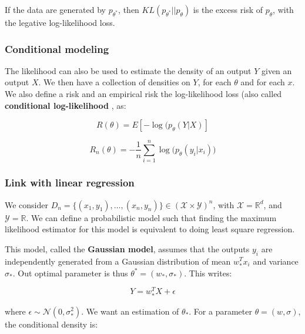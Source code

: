 \documentclass[
10pt, %
a4paper, %
oneside, %
headinclude,footinclude, %
BCOR5mm, %
]{scrartcl}
\begin{document}
\begin{lemma}
    
    If the data are generated by $p_{\theta^*}$, then $ KL(p_{\theta^*}||p_{\theta})$ is the excess risk of $p_{\theta}$, with the legative log-likelihood loss.
\end{lemma}

\subsubsection{\large\color{Periwinkle}Conditional modeling}

The likelihood can also be used to estimate the density of an output $Y$ given an output $X$. We then have a collection of densities on $Y$, for each $\theta$ and for each $x$. We also define a risk and an empirical risk the log-likelihood loss (also called \textbf{{conditional log-likelihood}} , as:

\begin{equation*}
    R(\theta) = E[-\log(p_{\theta}(Y|X)]
\end{equation*}

\begin{equation*}
    R_n(\theta) = - \frac{1}{n} \sum^{n}_{i=1} \log\big(p_{\theta}(y_i|x_i)\big)
\end{equation*}

\subsubsection{\large\color{Periwinkle}Link with linear regression}

We consider $D_n = \{(x_1, y_1), \dots, (x_n, y_n)\}\in (\mathcal{X}\times \mathcal{Y})^n$, with $ \mathcal{X} = \mathbb{R}^d$, and $ \mathcal{Y} = \mathbb{R} $. We can define a probabilistic model such that finding the maximum likelihood estimator for this model is equivalent to doing least square regression.

This model, called the \textbf{{Gaussian model}}, assumes that the outputs $y_i$ are independently generated from a Gaussian distribution of mean $w_*^Tx_i$ and variance $\sigma_*$. Out optimal parameter is thus $\theta^* =(w_*, \sigma_*)$. This writes:

\begin{equation*}
    Y = w_*^TX+\epsilon
\end{equation*}

where $\epsilon\sim \mathcal{N}(0, \sigma_*^2)$. We want an estimation of $\theta_*$. For a parameter $\theta=(w, \sigma)$, the conditional density is:
\end{document}
